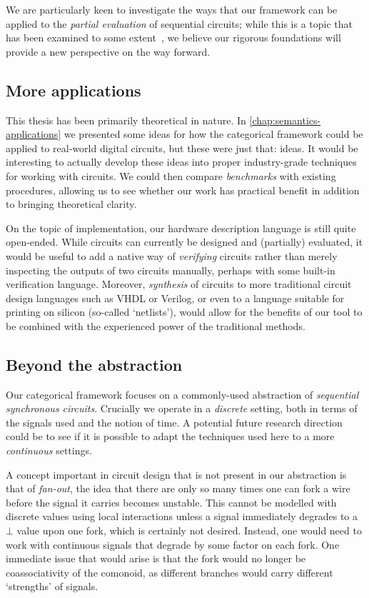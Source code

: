 We are particularly keen to investigate the ways that our framework can be
applied to the \emph{partial evaluation} of sequential circuits; while this is a
topic that has been examined to some
extent~\cite{singh1999partial,mckay1998dynamic,thompson2006bitlevel}, we believe
our rigorous foundations will provide a new perspective on the way forward.

\subsection{More applications}

This thesis has been primarily theoretical in nature.
In \cref{chap:semantics-applications} we presented some ideas for how
the categorical framework could be applied to real-world digital circuits, but
these were just that: ideas.
It would be interesting to actually develop these ideas into proper
industry-grade techniques for working with circuits.
We could then compare \emph{benchmarks} with existing procedures, allowing us to
see whether our work has practical benefit in addition to bringing theoretical
clarity.

On the topic of implementation, our hardware description language is still
quite open-ended.
While circuits can currently be designed and (partially) evaluated, it would be
useful to add a native way of \emph{verifying} circuits rather than merely
inspecting the outputs of two circuits manually, perhaps with some built-in
verification language.
Moreover, \emph{synthesis} of circuits to more traditional circuit design
languages such as VHDL or Verilog, or even to a language suitable for printing
on silicon (so-called `netlists'), would allow for the benefits of our tool to
be combined with the experienced power of the traditional methods.

\subsection{Beyond the abstraction}

Our categorical framework focuses on a commonly-used abstraction
of \emph{sequential synchronous circuits}.
Crucially we operate in a \emph{discrete} setting, both in terms of the signals
used and the notion of time.
A potential future research direction could be to see if it is possible to adapt
the techniques used here to a more \emph{continuous} settings.

A concept important in circuit design that is not present in our abstraction is
that of \emph{fan-out}, the idea that there are only so many times one can fork
a wire before the signal it carries becomes unstable.
This cannot be modelled with discrete values using local interactions unless a
signal immediately degrades to a \(\bot\) value upon one fork, which is
certainly not desired.
Instead, one would need to work with continuous signals that degrade by some
factor on each fork.
One immediate issue that would arise is that the fork would no longer be
coassociativity of the comonoid, as different branches would carry different
`strengths' of signals.


